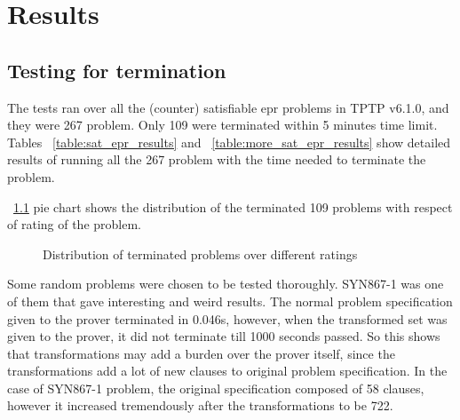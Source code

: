 \chapter{Results}\label{chap:res_and_lit}

\section{Testing for termination}


The tests ran over all the (counter) satisfiable \ac{epr} problems in TPTP v6.1.0, and they were 267 problem. Only 109 were terminated within 5 minutes time limit. Tables ~\ref{table:sat_epr_results} and ~\ref{table:more_sat_epr_results} show detailed results of running all the 267 problem with the time needed to terminate the problem.


~\ref{fig:res_dist} pie chart shows the distribution of the terminated 109 problems with respect of rating of the problem. 


\begin{figure}[H]
\centering
{}
\caption{Distribution of terminated problems over different ratings\label{fig:res_dist}}
\end{figure}



Some random problems were chosen to be tested thoroughly. SYN867-1 was one of them that gave interesting and weird results. The normal problem specification given to the prover terminated in 0.046s, however, when the transformed set was given to the prover, it did not terminate till 1000 seconds passed. So this shows that transformations may add a burden over the prover itself, since the transformations add a lot of new clauses to original problem specification. In the case of SYN867-1 problem, the original specification composed of 58 clauses, however it increased tremendously after the transformations to be 722.



